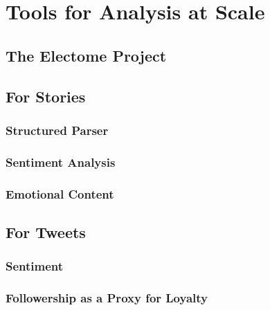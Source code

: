  \chapter{Tools for Analysis at Scale}
 \section{The Electome Project}

 \section{For Stories}
 \subsection{Structured Parser}
 \subsection{Sentiment Analysis}
 \subsection{Emotional Content}

 \section{For Tweets}
 \subsection{Sentiment}
 \subsection{Followership as a Proxy for Loyalty}



 

